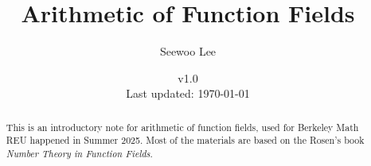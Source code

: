 \documentclass[letterpaper, 10pt]{article}
\begin{document}

\title{Arithmetic of Function Fields}


\author{Seewoo Lee}
\date{\normalsize\vspace{-1ex} v1.0 \\ Last updated: \today}


\maketitle



\begin{abstract}
This is an introductory note for arithmetic of function fields, used for Berkeley Math REU happened in Summer 2025.
Most of the materials are based on the Rosen's book \textit{Number Theory in Function Fields}.
\end{abstract}

\tableofcontents
\newpage










\newpage










\end{document}
